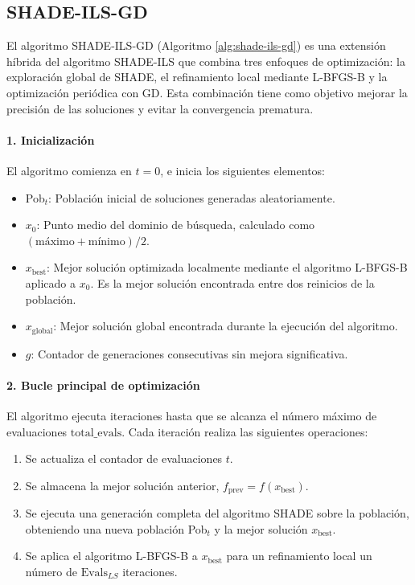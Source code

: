 \subsection{SHADE-ILS-GD}

El algoritmo SHADE-ILS-GD (Algoritmo \ref{alg:shade-ils-gd}) es una extensión híbrida del algoritmo SHADE-ILS que combina tres enfoques de optimización: la exploración global de SHADE, el refinamiento local mediante L-BFGS-B y la optimización periódica con GD. Esta combinación tiene como objetivo mejorar la precisión de las soluciones y evitar la convergencia prematura.

\paragraph{1. Inicialización\\}

El algoritmo comienza en $t = 0$, e inicia los siguientes elementos:

\begin{itemize}
    \item Pob$_t$: Población inicial de soluciones generadas aleatoriamente.
    \item $x_0$: Punto medio del dominio de búsqueda, calculado como $(\text{máximo} + \text{mínimo})/2$.
    \item $x_{\text{best}}$: Mejor solución optimizada localmente mediante el algoritmo L-BFGS-B aplicado a $x_0$. Es la mejor solución encontrada entre dos reinicios de la población.
    \item $x_{\text{global}}$: Mejor solución global encontrada durante la ejecución del algoritmo.
    \item $g$: Contador de generaciones consecutivas sin mejora significativa.
\end{itemize}

\paragraph{2. Bucle principal de optimización}

El algoritmo ejecuta iteraciones hasta que se alcanza el número máximo de evaluaciones $\text{total\_evals}$. Cada iteración realiza las siguientes operaciones:

\begin{enumerate}
    \item Se actualiza el contador de evaluaciones $t$.
    \item Se almacena la mejor solución anterior, $f_{\text{prev}} = f(x_{\text{best}})$.
    \item Se ejecuta una generación completa del algoritmo SHADE sobre la población, obteniendo una nueva población Pob$_t$ y la mejor solución $x_{\text{best}}$.
    \item Se aplica el algoritmo L-BFGS-B a $x_{\text{best}}$ para un refinamiento local un número de $\text{Evals}_{LS}$ iteraciones.
\end{enumerate}

